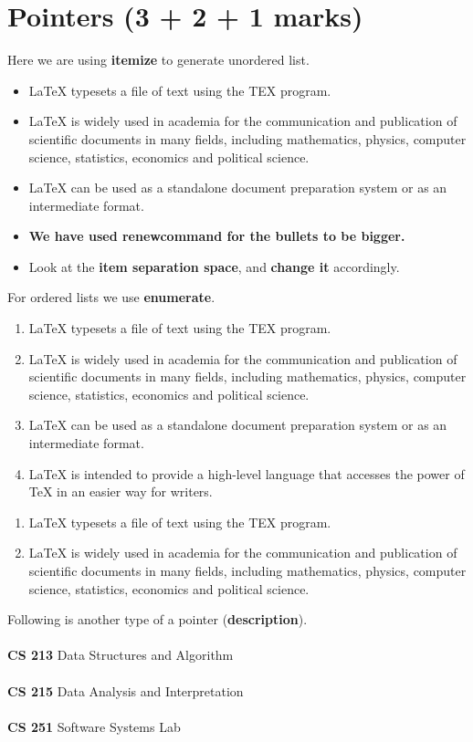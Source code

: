 \documentclass{article}
\begin{document}
\newpage
\section{Pointers (3 + 2 + 1 marks)}
Here we are using {\bfseries itemize} to generate unordered list.
\renewcommand{\labelitemi}{$\bullet$}
\begin{itemize}\itemsep15pt
\item \LaTeX{} typesets a file of text using the TEX program.
\item \LaTeX{} is widely used in academia for the communication and publication of scientific documents in many fields, including mathematics, physics, computer science, statistics, economics and political science.
\item \LaTeX{} can be used as a standalone document preparation system or as an intermediate format.
\item\textbf{We have used renewcommand for the bullets to be bigger.}
\item Look at the {\bfseries item separation space}, and {\bfseries change it} accordingly. \end{itemize}
For ordered lists we use {\bfseries enumerate}.
\renewcommand{\theenumi}{\Roman{enumi}}
\begin{enumerate}[label=\Roman*]
    \item \LaTeX{} typesets a file of text using the TEX program.
    \item \LaTeX{} is widely used in academia for the communication and publication of scientific documents in many fields, including mathematics, physics, computer science, statistics, economics and political science.
    \item  \LaTeX{} can be used as a standalone document preparation system or as an intermediate format.%
    \item \LaTeX{} is intended to provide a high-level language that accesses the power of TeX in an easier way for writers.
    \end{enumerate}
    \begin{enumerate}[label=(\alph*)]
        \item \LaTeX{} typesets a file of text using the TEX program.
        \item \LaTeX{} is widely used in academia for the communication and publication of scientific documents in many fields, including mathematics, physics, computer science, statistics, economics and political science.
\end{enumerate}
Following is another type of a pointer (\textbf{description}).\\ \\
\textbf{CS 213} Data Structures and Algorithm\\ \\
\textbf{CS 215} Data Analysis and Interpretation\\ \\
\textbf{CS 251} Software Systems Lab\\ \\
\newpage
\end{document}
